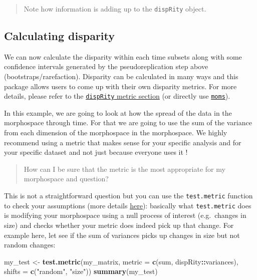 \documentclass[
]{book}
\newenvironment{Shaded}{\begin{snugshade}}{\end{snugshade}}
\newcommand{\DataTypeTok}[1]{\textcolor[rgb]{0.13,0.29,0.53}{#1}}
\newcommand{\KeywordTok}[1]{\textcolor[rgb]{0.13,0.29,0.53}{\textbf{#1}}}
\newcommand{\NormalTok}[1]{#1}
\newcommand{\OperatorTok}[1]{\textcolor[rgb]{0.81,0.36,0.00}{\textbf{#1}}}
\newcommand{\StringTok}[1]{\textcolor[rgb]{0.31,0.60,0.02}{#1}}
\begin{document}
\begin{quote}
Note how information is adding up to the \texttt{dispRity} object.
\end{quote}

\hypertarget{calculating-disparity-1}{%
\subsection{Calculating disparity}\label{calculating-disparity-1}}

We can now calculate the disparity within each time subsets along with some confidence intervals generated by the pseudoreplication step above (bootstraps/rarefaction).
Disparity can be calculated in many ways and this package allows users to come up with their own disparity metrics.
For more details, please refer to the \protect\hyperlink{disparity-metrics}{\texttt{dispRity} metric section} (or directly use \href{https://tguillerme.shinyapps.io/moms/}{\texttt{moms}}).

In this example, we are going to look at how the spread of the data in the morphospace through time.
For that we are going to use the sum of the variance from each dimension of the morphospace in the morphospace.
We highly recommend using a metric that makes sense for your specific analysis and for your specific dataset and not just because everyone uses it \citep[\citet{Guillerme2020}]{moms}!

\begin{quote}
How can I be sure that the metric is the most appropriate for my morphospace and question?
\end{quote}

This is not a straightforward question but you can use the \texttt{test.metric} function to check your assumptions (more details \protect\hyperlink{disparity-metrics}{here}): basically what \texttt{test.metric} does is modifying your morphospace using a null process of interest (e.g.~changes in size) and checks whether your metric does indeed pick up that change.
For example here, let see if the sum of variances picks up changes in size but not random changes:

\begin{Shaded}
\begin{Highlighting}[]
\NormalTok{my\_test \textless{}{-}}\StringTok{ }\KeywordTok{test.metric}\NormalTok{(my\_matrix, }\DataTypeTok{metric =} \KeywordTok{c}\NormalTok{(sum, dispRity}\OperatorTok{::}\NormalTok{variances), }\DataTypeTok{shifts =} \KeywordTok{c}\NormalTok{(}\StringTok{"random"}\NormalTok{, }\StringTok{"size"}\NormalTok{))}
\KeywordTok{summary}\NormalTok{(my\_test)}
\end{Highlighting}
\end{Shaded}
\end{document}
